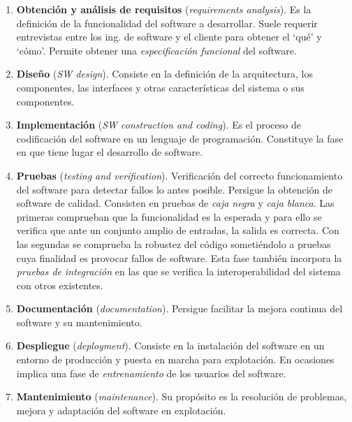 \begin{enumerate}
\item \textbf{Obtención y análisis de requisitos} 
(\emph{requirements analysis}). Es la definición de la funcionalidad del 
software a desarrollar. Suele requerir entrevistas entre los ing. de software 
y el cliente para obtener el `qué' y `cómo'. Permite obtener una 
\emph{especificación funcional} del software.

\item \textbf{Diseño} (\emph{SW design}). Consiste en la 
definición de la arquitectura, los componentes, las interfaces y otras 
características del sistema o sus componentes.

\item \textbf{Implementación} (\emph{SW construction and coding}). Es el
  proceso de codificación del software en un lenguaje de programación.
  Constituye la fase en que tiene lugar el desarrollo de software.

\item \textbf{Pruebas} (\emph{testing and verification}). 
Verificación del correcto funcionamiento del software para detectar fallos lo 
antes posible. Persigue la obtención de software de calidad. Consisten en 
pruebas de \emph{caja negra} y \emph{caja blanca}. Las primeras comprueban 
que la funcionalidad es la esperada y para ello se verifica que ante un 
conjunto amplio de entradas, la salida es correcta. Con las segundas se 
comprueba la robustez del código sometiéndolo a pruebas cuya finalidad es 
provocar fallos de software. Esta fase también incorpora la \emph{pruebas de 
integración} en las que se verifica la interoperabilidad del sistema con 
otros existentes.

\item \textbf{Documentación} (\emph{documentation}). Persigue facilitar la mejora continua del software y su mantenimiento.

\item \textbf{Despliegue} (\emph{deployment}). Consiste en 
la instalación del software en un entorno de producción y puesta en marcha 
para explotación. En ocasiones implica una fase de \emph{entrenamiento} de 
los usuarios del software.

\item \textbf{Mantenimiento} (\emph{maintenance}). Su 
propósito es la resolución de problemas, mejora y adaptación del software en 
explotación.
\end{enumerate}




